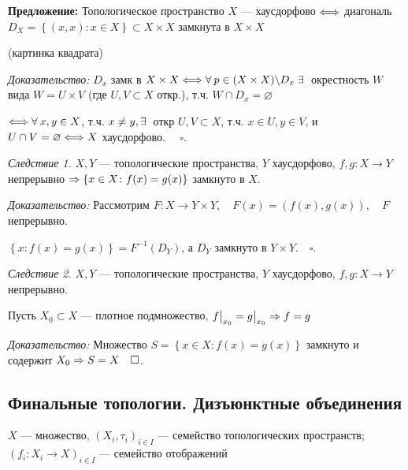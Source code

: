 \documentclass[../../main.tex]{subfiles}
\begin{document}
\textbf{Предложение:} Топологическое пространство $X$ — хаусдорфово $\Longleftrightarrow$ диагональ $D_X = \left\{ (x, x) \colon x \in X \right\} \subset X \times X$ замкнута в $X \times X$

\begin{minipage}{0.2\linewidth}
(картинка квадрата)
\end{minipage}
\begin{minipage}{0.8\linewidth}
\textit{Доказательство:} $D_x$ замк в $X \times X \Longleftrightarrow \forall\: p \in (X \times X) \backslash D_x \; \exists\: $ окрестность $W$ вида $W = U \times V$ (где $U, V \subset X$ откр.), т.ч. $W \cap D_x = \varnothing$

$\Longleftrightarrow \forall\: x, y \in X$, т.ч. $x \neq y, \exists\:$ откр $U,V \subset X$, т.ч. $x \in U, y \in V$, и $U \cap V = \varnothing \Longleftrightarrow X$ хаусдорфово. $\quad \square$.
\end{minipage}

\textit{Следствие 1.} $X, Y$ — топологические пространства, $Y$ хаусдорфово, $f, g \colon X \to Y$ непрерывно $\Rightarrow \left\{x \in X\colon f(x) = g(x) \right\}$ замкнуто в $X$.

\textit{Доказательство:} Рассмотрим $F \colon X \to Y \times Y, \quad F(x) = \left(f(x), g(x) \right), \quad F$ непрерывно.

$\left\{ x \colon f(x) = g(x) \right\} = F^{-1}\left( D_Y \right)$, а $D_Y$ замкнуто в $Y \times Y. \quad \square$.

\textit{Следствие 2.}  $X, Y$ — топологические пространства, $Y$ хаусдорфово, $f, g \colon X \to Y$ непрерывно.

Пусть $X_0 \subset X$ — плотное подмножество, $f\big|_{x_0} = g\big|_{x_0} \Rightarrow f = g$

\textit{Доказательство:} Множество $S = \left\{ x \in X \colon f(x) = g(x) \right\}$ замкнуто и содержит $X_0 \Rightarrow S = X \quad \square$.

\subsection{Финальные топологии. Дизъюнктные объединения}

$X$ — множество, $( X_i, \tau_i)_{i \in I}$ — семейство топологических пространств; $(f_i \colon X_i \to X)_{i \in I}$ — семейство отображений
\end{document}
